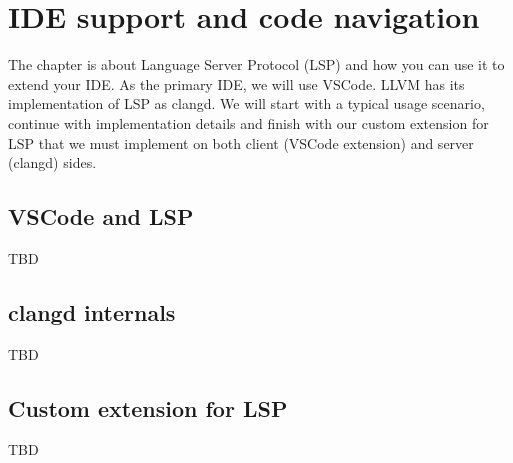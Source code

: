 \chapter{IDE support and code navigation}
 The chapter is about Language Server Protocol (LSP) and how you can use it to
 extend your IDE. As the primary IDE, we will use VSCode. LLVM has its
 implementation of LSP as clangd. We will start with a typical usage scenario,
 continue with implementation details and finish with our custom extension for
 LSP that we must implement on both client (VSCode extension) and server
 (clangd) sides. 

\section{VSCode and LSP}
TBD

\section{clangd internals}
TBD

\section{Custom extension for LSP}
TBD
